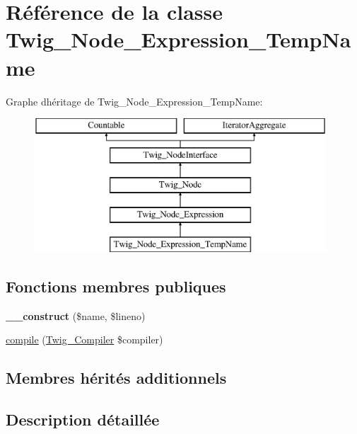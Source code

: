 \hypertarget{class_twig___node___expression___temp_name}{}\section{Référence de la classe Twig\+\_\+\+Node\+\_\+\+Expression\+\_\+\+Temp\+Name}
\label{class_twig___node___expression___temp_name}
Graphe d\textquotesingle{}héritage de Twig\+\_\+\+Node\+\_\+\+Expression\+\_\+\+Temp\+Name\+:\begin{figure}[H]
\begin{center}
\leavevmode
\includegraphics[height=5.000000cm]{class_twig___node___expression___temp_name}
\end{center}
\end{figure}
\subsection*{Fonctions membres publiques}
\begin{DoxyCompactItemize}
\item 
{\bfseries \+\_\+\+\_\+construct} (\$name, \$lineno)\hypertarget{class_twig___node___expression___temp_name_ae217ce26c809152fd385490096a36b75}{}\label{class_twig___node___expression___temp_name_ae217ce26c809152fd385490096a36b75}

\item 
\hyperlink{class_twig___node___expression___temp_name_a4e0faa87c3fae583620b84d3607085da}{compile} (\hyperlink{class_twig___compiler}{Twig\+\_\+\+Compiler} \$compiler)
\end{DoxyCompactItemize}
\subsection*{Membres hérités additionnels}


\subsection{Description détaillée}


